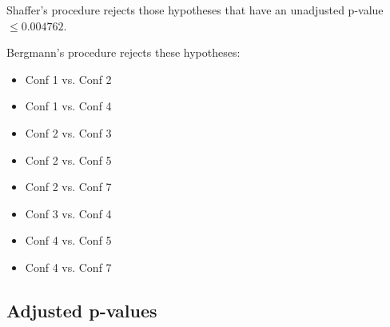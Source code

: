 \documentclass[a4paper,10pt]{article}
\begin{document}
\begin{landscape}
Shaffer's procedure rejects those hypotheses that have an unadjusted p-value $\le0.004762$.

Bergmann's procedure rejects these hypotheses:

\begin{itemize}

\item Conf 1 vs. Conf 2

\item Conf 1 vs. Conf 4

\item Conf 2 vs. Conf 3

\item Conf 2 vs. Conf 5

\item Conf 2 vs. Conf 7

\item Conf 3 vs. Conf 4

\item Conf 4 vs. Conf 5

\item Conf 4 vs. Conf 7

\end{itemize}

\pagebreak

\subsection{Adjusted p-values}


\end{landscape}
\end{document}
